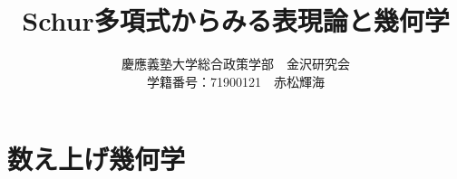\documentclass{ltjsreport}
\title{Schur多項式からみる表現論と幾何学}
\author{慶應義塾大学総合政策学部　金沢研究会\\学籍番号：71900121　赤松輝海}
\date{}
\begin{document}
\maketitle

\newpage


\tableofcontents
\newpage


\newpage


\newpage
\chapter{数え上げ幾何学}



\newpage


\newpage

\end{document}
